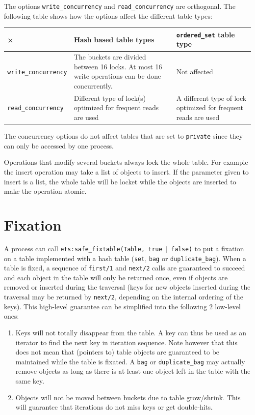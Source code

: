 \documentclass[aps,pre,preprint,nofootinbib]{revtex4}
\begin{document}
The options \verb|write_concurrency| and \verb|read_concurrency| are orthogonal.
The following table shows how the options affect the different table types:

\begin{center}
\begin{tabular}{l|p{5cm}|p{5cm}}
× & Hash based table types & \verb|ordered_set| table type \\ \hline
\verb|write_concurrency| & 
The buckets are divided between 16 locks. At most 16 write operations can be done concurrently. 
& Not affected\\
\verb|read_concurrency| & 
Different type of lock(s) optimized for frequent reads are used & 
A different type of lock optimized for frequent reads are used
\end{tabular}
\end{center} 

The concurrency options do not affect tables that are set to \verb|private| since they can only be accessed by one process.

Operations that modify several buckets always lock the whole table.
For example the insert operation may take a list of objects to insert.
If the parameter given to insert is a list, the whole table will be locket while the objects are inserted to make the operation atomic.

\section{Fixation}
\label{sec:fixation}

A process can call \texttt{ets:safe\_fixtable(Table, true $|$ false)} to put a fixation on a table implemented with a hash table (\verb|set|, \verb|bag| or \verb|duplicate_bag|).
When a table is fixed, a sequence of \verb|first/1| and \verb|next/2| calls are guaranteed to succeed and each object in the table will only be returned once, even if objects are removed or inserted during the traversal (keys for new objects inserted during the traversal may be returned by \verb|next/2|, depending on the internal ordering of the keys).
This high-level guarantee can be simplified into the following 2 low-level ones:

\begin{enumerate}
\item Keys will not totally disappear from the table.
  A key can thus be used as an iterator to find the next key in iteration sequence.
  Note however that this does not mean that (pointers to) table objects are guaranteed to be maintained while the table is fixated.
  A \verb|bag| or \verb|duplicate_bag| may actually remove objects as long as there is at least one object left in the table with the same key.
\item Objects will not be moved between buckets due to table grow/shrink.
  This will guarantee that iterations do not miss keys or get double-hits.
\end{enumerate}
\end{document}
